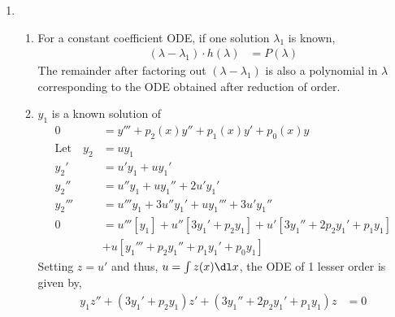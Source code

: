 \begin{enumerate}
    \item
          \begin{enumerate}
              \item For a constant coefficient ODE, if one solution $ \lambda_{1} $
                    is known,
                    \begin{align}
                        (\lambda - \lambda_{1}) \cdot h(\lambda) & = P(\lambda)
                    \end{align}
                    The remainder after factoring out $ (\lambda - \lambda_{1}) $ is also
                    a polynomial in $ \lambda $ corresponding to the ODE obtained after
                    reduction of order.
              \item $ y_{1} $ is a known solution of
                    \begin{align}
                        0                      & = y''' + p_{2}(x)y'' + p_{1}(x)y'
                        + p_{0}(x)y                                                   \\
                        \text{Let} \quad y_{2} & = uy_{1}                             \\
                        y_{2}'                 & = u'y_{1} + uy_{1}'                  \\
                        y_{2}''                & = u''y_{1} + uy_{1}'' + 2u'y_{1}'    \\
                        y_{2}'''               & = u'''y_{1} + 3u''y_{1}' + uy_{1}'''
                        + 3u'y_{1}''                                                  \\
                        0                      & = u'''[y_{1}] + u''[3y_{1}'
                        + p_{2}y_{1}]
                        + u'[3y_{1}'' + 2p_{2}y_{1}' + p_{1}y_{1}]  \nonumber         \\
                                               & + u[y_{1}''' + p_{2}y_{1}''
                        + p_{1}y_{1}'
                        + p_{0}y_{1}]
                    \end{align}
                    Setting $ z = u' $ and thus, $ u = \int z(x) \dl x $, the ODE of 1
                    lesser order is given by,
                    \begin{align}
                        y_{1}z'' + (3y_{1}' + p_{2}y_{1})z' + (3y_{1}'' + 2p_{2}y_{1}'
                        + p_{1}y_{1})z & = 0
                    \end{align}


\end{enumerate}
\end{enumerate}
